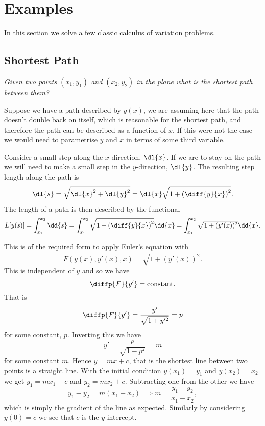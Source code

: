 \documentclass[fleqn]{NotesClass}
\begin{document}
    \section{Examples}
    In this section we solve a few classic calculus of variation problems.
    
    \subsection{Shortest Path}
    \textit{Given two points \((x_1, y_1)\) and \((x_2, y_2)\) in the plane what is the shortest path between them?}
    
    Suppose we have a path described by \(y(x)\), we are assuming here that the path doesn't double back on itself, which is reasonable for the shortest path, and therefore the path can be described as a function of \(x\).
    If this were not the case we would need to parametrise \(y\) and \(x\) in terms of some third variable.
    
    Consider a small step along the \(x\)-direction, \(\dl{x}\).
    If we are to stay on the path we will need to make a small step in the \(y\)-direction, \(\dl{y}\).
    The resulting step length along the path is
    \begin{equation}
        \dl{s} = \sqrt{\dl{x}^2 + \dl{y}^2} = \dl{x}\sqrt{1 + \left( \diff{y}{x} \right)^2}.
    \end{equation}
    The length of a path is then described by the functional
    \begin{equation}
        L[y(s)] = \int_{x_1}^{x_2} \dd{s} = \int_{x_1}^{x_2} \sqrt{1 + \left( \diff{y}{x} \right)^2}\dd{x} = \int_{x_1}^{x_2} \sqrt{1 + (y'(x))^2} \dd{x}.
    \end{equation}

    This is of the required form to apply Euler's equation with
    \begin{equation}
        F(y(x), y'(x), x) = \sqrt{1 + (y'(x))^2}.
    \end{equation}
    This is independent of \(y\) and so we have
    \begin{equation}
        \diffp{F}{y'} = \text{constant.}
    \end{equation}
    That is
    \begin{equation}
        \diffp{F}{y'} = \frac{y'}{\sqrt{1 + y'^2}} = p
    \end{equation}
    for some constant, \(p\).
    Inverting this we have
    \begin{equation}
        y' = \frac{p}{\sqrt{1 - p^2}} = m
    \end{equation}
    for some constant \(m\).
    Hence \(y = mx + c\), that is the shortest line between two points is a straight line.
    With the initial condition \(y(x_1) = y_1\) and \(y(x_2) = x_2\) we get \(y_1 = mx_1 + c\) and \(y_2 = mx_2 + c\).
    Subtracting one from the other we have
    \begin{equation}
        y_1 - y_2 = m(x_1 - x_2) \implies m = \frac{y_1 - y_2}{x_1 - x_2},
    \end{equation}
    which is simply the gradient of the line as expected.
    Similarly by considering \(y(0) = c\) we see that \(c\) is the \(y\)-intercept.
    
\end{document}
